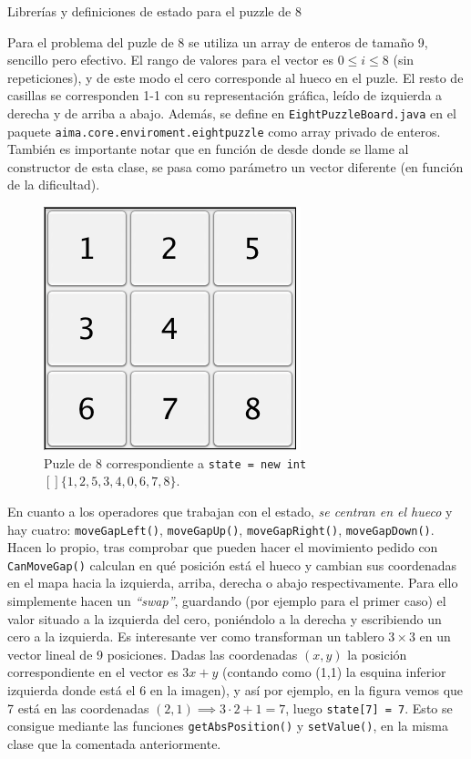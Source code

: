 \documentclass[11pt, a4paper, spanish, openright, twoside]{book}
\begin{document}
\begin{section}{Librerías y definiciones de estado para el puzzle de 8 }

Para el problema del puzle de 8 se utiliza un array de enteros de tamaño 9, sencillo pero efectivo. El rango de valores para el vector es $0\le i \le 8$ (sin repeticiones), y de este modo el cero corresponde al hueco en el puzle. El resto de casillas se corresponden 1-1 con su representación gráfica, leído de izquierda a derecha y de arriba a abajo. Además, se define en \texttt{EightPuzzleBoard.java} en el paquete \texttt{aima.core.enviroment.eightpuzzle} como array privado de enteros. También es importante notar que en función de desde donde se llame al constructor de esta clase, se pasa como parámetro un vector diferente (en función de la dificultad). 

\begin{figure}[!h]
		\begin{center}
			\includegraphics[scale=0.65]{puzle8}
			\caption{Puzle de 8 correspondiente a \texttt{state = new int$[] \{ 1, 2, 5, 3, 4, 0, 6, 7, 8 \}$}.}
		\end{center}
	\end{figure}
\end{section}

En cuanto a los operadores que trabajan con el estado, \textit{se centran en el hueco} y hay cuatro: \texttt{moveGapLeft()}, \texttt{moveGapUp()}, \texttt{moveGapRight()}, \texttt{moveGapDown()}. Hacen lo propio, tras comprobar que pueden hacer el movimiento pedido con \texttt{CanMoveGap()} calculan en qué posición está el hueco y cambian sus coordenadas en el mapa hacia la izquierda, arriba, derecha o abajo respectivamente. Para ello simplemente hacen un \textit{``swap''}, guardando (por ejemplo para el primer caso) el valor situado a la izquierda del cero, poniéndolo a la derecha y escribiendo un cero a la izquierda. Es interesante ver como transforman un tablero $3\times 3$ en un vector lineal de 9 posiciones. Dadas las coordenadas $(x,y)$ la posición correspondiente en el vector es $3x + y$ (contando como (1,1) la esquina inferior izquierda donde está el 6 en la imagen), y así por ejemplo, en la figura vemos que 7 está en las coordenadas $(2,1)\implies 3\cdot 2 + 1 = 7$, luego \texttt{state[7] = 7}. Esto se consigue mediante las funciones \texttt{getAbsPosition()} y \texttt{setValue()}, en la misma clase que la comentada anteriormente.
\end{document}
